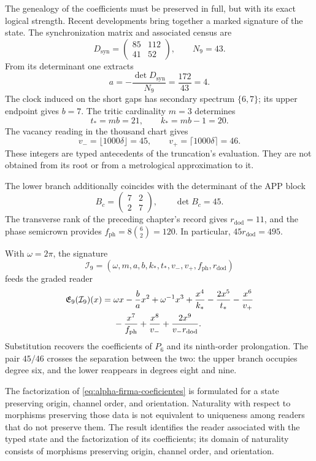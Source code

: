 The genealogy of the coefficients must be preserved in full, but with its
exact logical strength. Recent developments bring together a marked signature
of the state. The synchronization matrix and associated census are
\[
 D_{\mathrm{syn}}=\begin{pmatrix}85&112\\41&52\end{pmatrix},
 \qquad N_9=43.
\]
From its determinant one extracts
\[
 a=-\frac{\det D_{\mathrm{syn}}}{N_9}
   =\frac{172}{43}=4.
\]
The clock induced on the short gaps has secondary spectrum
\(\{6,7\}\); its upper endpoint gives \(b=7\). The tritic cardinality
\(m=3\) determines
\[
 t_*=mb=21,\qquad k_*=mb-1=20.
\]
The vacancy reading in the thousand chart gives
\[
 v_-=\lfloor1000\delta\rfloor=45,\qquad
 v_+=\lceil1000\delta\rceil=46.
\]
These integers are typed antecedents of the truncation's evaluation. They are not
obtained from its root or from a metrological approximation to it.

The lower branch additionally coincides with the determinant of the APP block
\[
 B_c=\begin{pmatrix}7&2\\2&7\end{pmatrix},\qquad\det B_c=45.
\]
The transverse rank of the preceding chapter's record gives
\(r_{\mathrm{dod}}=11\), and the phase semicrown provides
\(f_{\mathrm{ph}}=8\binom62=120\). In particular,
\(45r_{\mathrm{dod}}=495\).

With \(\omega=2\pi\), the signature
\[
 \mathcal I_9=(\omega,m,a,b,k_*,t_*,v_-,v_+,f_{\mathrm{ph}},r_{\mathrm{dod}})
\]
feeds the graded reader
\begin{align}
 \mathfrak E_9(\mathcal I_9)(x)
 ={}&\omega x-\frac ba x^2+\omega^{-1}x^3
 +\frac{x^4}{k_*}-\frac{2x^5}{t_*}-\frac{x^6}{v_+}\notag\\
 &-\frac{x^7}{f_{\mathrm{ph}}}+\frac{x^8}{v_-}
 +\frac{2x^9}{v_-r_{\mathrm{dod}}}.
 \label{eq:alpha-firma-coeficientes}
\end{align}
Substitution recovers the coefficients of \(P_6\) and its
ninth-order prolongation. The pair \(45/46\) crosses the separation
between the two: the upper branch occupies degree six, and the lower reappears
in degrees eight and nine.

The factorization of \eqref{eq:alpha-firma-coeficientes} is formulated
for a state preserving origin, channel order, and orientation. Naturality
with respect to morphisms preserving those data is not equivalent to
uniqueness among readers that do not preserve them. The result identifies
the reader associated with the typed state and the factorization of its
coefficients; its domain of naturality consists of morphisms preserving
origin, channel order, and orientation.

